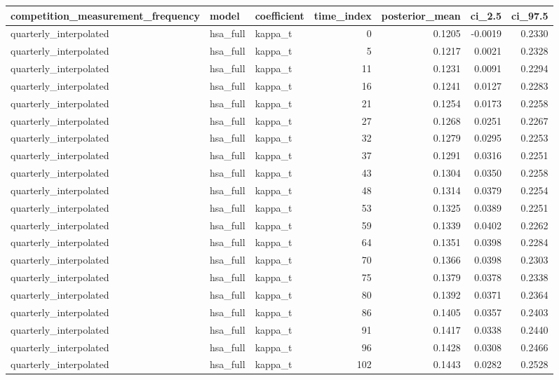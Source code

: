 \begin{tabular}{lllrrrr}
\toprule
competition\_measurement\_frequency & model & coefficient & time\_index & posterior\_mean & ci\_2.5 & ci\_97.5 \\
\midrule
quarterly\_interpolated & hsa\_full & kappa\_t & 0 & 0.1205 & -0.0019 & 0.2330 \\
quarterly\_interpolated & hsa\_full & kappa\_t & 5 & 0.1217 & 0.0021 & 0.2328 \\
quarterly\_interpolated & hsa\_full & kappa\_t & 11 & 0.1231 & 0.0091 & 0.2294 \\
quarterly\_interpolated & hsa\_full & kappa\_t & 16 & 0.1241 & 0.0127 & 0.2283 \\
quarterly\_interpolated & hsa\_full & kappa\_t & 21 & 0.1254 & 0.0173 & 0.2258 \\
quarterly\_interpolated & hsa\_full & kappa\_t & 27 & 0.1268 & 0.0251 & 0.2267 \\
quarterly\_interpolated & hsa\_full & kappa\_t & 32 & 0.1279 & 0.0295 & 0.2253 \\
quarterly\_interpolated & hsa\_full & kappa\_t & 37 & 0.1291 & 0.0316 & 0.2251 \\
quarterly\_interpolated & hsa\_full & kappa\_t & 43 & 0.1304 & 0.0350 & 0.2258 \\
quarterly\_interpolated & hsa\_full & kappa\_t & 48 & 0.1314 & 0.0379 & 0.2254 \\
quarterly\_interpolated & hsa\_full & kappa\_t & 53 & 0.1325 & 0.0389 & 0.2251 \\
quarterly\_interpolated & hsa\_full & kappa\_t & 59 & 0.1339 & 0.0402 & 0.2262 \\
quarterly\_interpolated & hsa\_full & kappa\_t & 64 & 0.1351 & 0.0398 & 0.2284 \\
quarterly\_interpolated & hsa\_full & kappa\_t & 70 & 0.1366 & 0.0398 & 0.2303 \\
quarterly\_interpolated & hsa\_full & kappa\_t & 75 & 0.1379 & 0.0378 & 0.2338 \\
quarterly\_interpolated & hsa\_full & kappa\_t & 80 & 0.1392 & 0.0371 & 0.2364 \\
quarterly\_interpolated & hsa\_full & kappa\_t & 86 & 0.1405 & 0.0357 & 0.2403 \\
quarterly\_interpolated & hsa\_full & kappa\_t & 91 & 0.1417 & 0.0338 & 0.2440 \\
quarterly\_interpolated & hsa\_full & kappa\_t & 96 & 0.1428 & 0.0308 & 0.2466 \\
quarterly\_interpolated & hsa\_full & kappa\_t & 102 & 0.1443 & 0.0282 & 0.2528 \\

\end{tabular}

